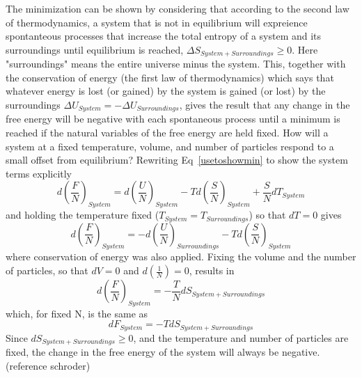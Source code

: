 \documentclass[12pt]{article}
\begin{document}
The minimization can be shown by considering that according to the second law of thermodynamics, a system that is not in equilibrium will expreience spontanteous processes that increase the total entropy of a system and its surroundings until equilibrium is reached, $\Delta{S}_{System + Surroundings} \geq 0$. Here "surroundings" means the entire universe minus the system. This, together with the conservation of energy (the first law of thermodynamics) which says that whatever energy is lost (or gained) by the system is gained (or lost) by the surroundings $\Delta{U}_{System}=-\Delta{U}_{Surroundings}$, gives the result that any change in the free energy will be negative with each spontaneous process until a minimum is reached if the natural variables of the free energy are held fixed.  How will a system at a fixed temperature, volume, and number of particles respond to a small offset from equilibrium? Rewriting Eq~\ref{usetoshowmin} to show the system terms explicitly
\begin{equation}d\left(\frac{F}{N}\right)_{System}=d\left(\frac{U}{N}\right)_{System}-Td\left(\frac{S}{N}\right)_{System}+\frac{S}{N}dT_{System}\end{equation}
and holding the temperature fixed ($T_{System}=T_{Surroundings}$) so that $dT=0$ gives
\begin{equation}d\left(\frac{F}{N}\right)_{System}=-d\left(\frac{U}{N}\right)_{Surroundings}-Td\left(\frac{S}{N}\right)_{System}\end{equation}
where conservation of energy was also applied. Fixing the volume and the number of particles, so that $dV=0$ and $d\left(\frac{1}{N}\right)=0$, results in
\begin{equation}d\left(\frac{F}{N}\right)_{System}=-\frac{T}{N}dS_{System+Surroundings} \end{equation}which, for fixed N, is the same as
\begin{equation}dF_{System}=-TdS_{System+Surroundings} \end{equation} Since $dS_{System+Surroundings} \geq{0}$, and the temperature and number of particles are fixed, the change in the free energy of the system will always be negative. (reference schroder)
\end{document}
